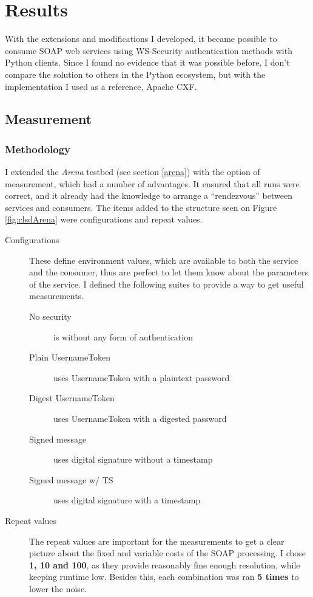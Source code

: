 \chapter{Results}

With the extensions and modifications I developed, it became possible to consume SOAP web services using WS-Security authentication methods with Python clients. Since I found no evidence that it was possible before, I don't compare the solution to others in the Python ecosystem, but with the implementation I used as a reference, Apache CXF.

\section{Measurement}

\subsection{Methodology}

I extended the \emph{Arena} testbed (see section \ref{arena}) with the option of measurement, which had a number of advantages. It ensured that all runs were correct, and it already had the knowledge to arrange a ``rendezvous'' between services and consumers. The items added to the structure seen on Figure \ref{fig:clsdArena} were configurations and repeat values.

\begin{description}
 \item[Configurations] These define environment values, which are available to both the service and the consumer, thus are perfect to let them know about the parameters of the service. I defined the following suites to provide a way to get useful measurements.
 \begin{description}
  \item[No security] is without any form of authentication
  \item[Plain UsernameToken] uses UsernameToken with a plaintext password
  \item[Digest UsernameToken] uses UsernameToken with a digested password
  \item[Signed message] uses digital signature without a timestamp
  \item[Signed message w/ TS] uses digital signature with a timestamp
 \end{description}
 \item[Repeat values] The repeat values are important for the measurements to get a clear picture about the fixed and variable costs of the SOAP processing. I chose \textbf{1, 10 and 100}, as they provide reasonably fine enough resolution, while keeping runtime low. Besides this, each combination was ran \textbf{5 times} to lower the noise.
\end{description}

